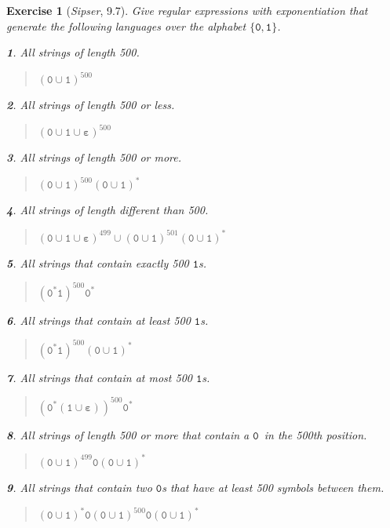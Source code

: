 \documentclass{article}
\theoremstyle{break}			%
\newtheorem{exercise}{Exercise}
\theoremstyle{plain}
\newtheorem{subexercise}{}[exercise]
\newenvironment{answer}{\begin{quotation}\noindent}{\end{quotation}}
\newcommand{\sipser}{\textit{Sipser}}
\newcommand{\sym}[1]{\ensuremath{\mathtt{#1}}}
\newcommand{\set}[1]{\ensuremath{\{#1\}}}
\newcommand{\enumlang}[1]{\set{\sym{#1}}}
\newcommand{\union}{\cup}
\newcommand{\emptystring}{\ensuremath{\boldsymbol\varepsilon}}
\begin{document}
\begin{exercise}[\sipser, 9.7]
Give regular expressions with exponentiation that generate the
following languages over the alphabet $\enumlang{0,1}$.
\begin{subexercise}
All strings of length 500.
\end{subexercise}
\begin{answer}
$(\sym 0\union\sym 1)^{500}$
\end{answer}
\begin{subexercise}
All strings of length 500 or less.
\end{subexercise}
\begin{answer}
$(\sym 0\union\sym 1\union\emptystring)^{500}$
\end{answer}
\begin{subexercise}
All strings of length 500 or more.
\end{subexercise}
\begin{answer}
$(\sym 0\union\sym 1)^{500}(\sym 0\union\sym 1)^*$
\end{answer}
\begin{subexercise}
All strings of length different than 500.
\end{subexercise}
\begin{answer}
$(\sym 0\union\sym 1\union\emptystring)^{499}\union(\sym 0\union\sym 1)^{501}(\sym 0\union\sym 1)^*$
\end{answer}
\begin{subexercise}
All strings that contain exactly 500 \sym 1s.
\end{subexercise}
\begin{answer}
$(\sym 0^*\sym 1)^{500}\sym 0^*$
\end{answer}
\begin{subexercise}
All strings that contain at least 500 \sym 1s.
\end{subexercise}
\begin{answer}
$(\sym 0^*\sym 1)^{500}(\sym 0\union\sym 1)^*$
\end{answer}
\begin{subexercise}
All strings that contain at most 500 \sym 1s.
\end{subexercise}
\begin{answer}
$(\sym 0^*(\sym 1\union\emptystring))^{500}\sym 0^*$
\end{answer}
\begin{subexercise}
All strings of length 500 or more that contain a \sym 0\ in the 500th
position.
\end{subexercise}
\begin{answer}
$(\sym 0\union\sym 1)^{499}\sym 0(\sym 0\union\sym 1)^*$
\end{answer}
\begin{subexercise}
All strings that contain two \sym 0s that have at least 500 symbols
between them.
\end{subexercise}
\begin{answer}
$(\sym 0\union\sym 1)^*\sym 0(\sym 0\union\sym 1)^{500}\sym 0(\sym 0\union\sym 1)^*$
\end{answer}
\end{exercise}
\end{document}
